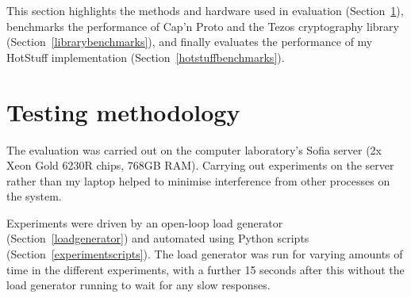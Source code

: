 



This section highlights the methods and hardware used in evaluation (Section~\ref{testingmethods}), benchmarks the performance of Cap'n Proto and the Tezos cryptography library (Section~\ref{librarybenchmarks}), and finally evaluates the performance of my HotStuff implementation (Section~\ref{hotstuffbenchmarks}).

\section{Testing methodology} \label{testingmethods}
The evaluation was carried out on the computer laboratory's Sofia server (2x Xeon Gold 6230R chips, 768GB RAM). Carrying out experiments on the server rather than my laptop helped to minimise interference from other processes on the system.

Experiments were driven by an open-loop load generator (Section~\ref{loadgenerator}) and automated using Python scripts (Section~\ref{experimentscripts}). The load generator was run for varying amounts of time in the different experiments, with a further 15 seconds after this without the load generator running to wait for any slow responses.

